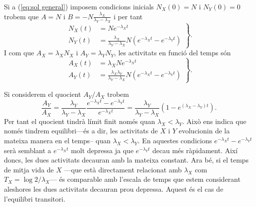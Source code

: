 \documentclass[12pt]{article}
\begin{document}
Si a (\ref{eq:sol general}) imposem condicions inicials \( N_X(0) = N \) i \( N_Y(0) = 0 \) trobem que \( A = N \) i \( B = -N\frac{\lambda_X}{\lambda_Y - \lambda_X} \) i per tant 
\begin{equation*}
	\left.
		\begin{aligned}
			N_X(t) &= Ne^{-\lambda_X t} \\
			N_Y(t) &= \frac{\lambda_X}{\lambda_Y - \lambda_X}N \left(e^{-\lambda_X t} - e^{-\lambda_Y t}\right)
		\end{aligned}
	\right\}.
\end{equation*}
I com que \( A_X = \lambda_X N_X \) i \( A_Y = \lambda_Y N_Y \), les activitats en funció del temps són
\begin{equation} \label{eq:activitats}
	\left.
		\begin{aligned}
			A_X(t) &= \lambda_XNe^{-\lambda_X t} \\
			A_Y(t) &= \frac{\lambda_X \lambda_Y}{\lambda_Y - \lambda_X}N \left(e^{-\lambda_X t} - e^{-\lambda_Y t}\right)
		\end{aligned}
	\right\}.
\end{equation}

Si considerem el quocient \( A_Y / A_X \) trobem
\begin{equation*}
	\frac{A_Y}{A_X} = \frac{\lambda_Y}{\lambda_Y - \lambda_X} \frac{e^{-\lambda_X t} - e^{-\lambda_Y t}}{e^{-\lambda_X t}} = \frac{\lambda_Y}{\lambda_Y - \lambda_X} \left(1 - e^{(\lambda_X - \lambda_Y) t}\right).
\end{equation*}
Per tant el quocient tindrà límit finit només quan \( \lambda_X < \lambda_Y \). Això ens indica que només tindrem equilibri---és a dir, les activitats de \( X \) i \( Y \) evolucionin de la mateixa manera en el temps--  quan \( \lambda_X < \lambda_Y \). En aquestes condicions \( e^{-\lambda_X t} - e^{-\lambda_Y t} \) serà semblant a \( e^{-\lambda_X t}  \) molt depressa ja que \( e^{-\lambda_Y t} \) decau més ràpidament. Així doncs, les dues activitats decauran amb la mateixa constant. Ara bé, si el temps de mitja vida de \( X \) ---que està directament relacionat amb \( \lambda_X \) com \( T_X = \log{2}/\lambda_X \)--- és comparable amb l'escala de temps que estem considerant aleshores les dues activitats decauran prou depressa. Aquest és el cas de l'equilibri transitori. 
\end{document}
